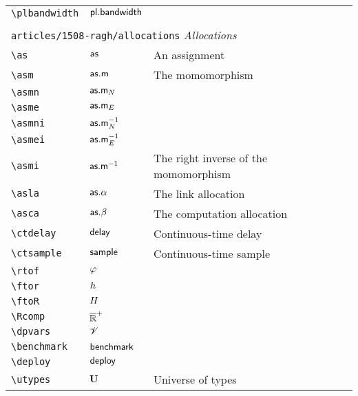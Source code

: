 \begin{longtable}{lll}
 {\color[rgb]{0.5,0.5,0.5}\texttt{\textbackslash plbandwidth}} & $\mathsf{pl.bandwidth}$ & \\ 
  &  & \\ 
 \multicolumn{3}{l}{{\color[rgb]{0.5,0.5,0.5}\texttt{articles/1508-ragh/allocations}} \emph{Allocations}}\\ 
 \hline
{\color[rgb]{0.5,0.5,0.5}\texttt{\textbackslash as}} & $\mathsf{as}$ &  An assignment\\ 
 {\color[rgb]{0.5,0.5,0.5}\texttt{\textbackslash asm}} & $\mathsf{as.m}$ &  The momomorphism \\ 
 {\color[rgb]{0.5,0.5,0.5}\texttt{\textbackslash asmn}} & $\mathsf{as.m}_N$ & \\ 
 {\color[rgb]{0.5,0.5,0.5}\texttt{\textbackslash asme}} & $\mathsf{as.m}_E$ & \\ 
 {\color[rgb]{0.5,0.5,0.5}\texttt{\textbackslash asmni}} & $\mathsf{as.m}^{-1}_N$ & \\ 
 {\color[rgb]{0.5,0.5,0.5}\texttt{\textbackslash asmei}} & $\mathsf{as.m}^{-1}_E$ & \\ 
 {\color[rgb]{0.5,0.5,0.5}\texttt{\textbackslash asmi}} & $\mathsf{as.{m}^{-1}}$ &  The right inverse of the momomorphism \\ 
 {\color[rgb]{0.5,0.5,0.5}\texttt{\textbackslash asla}} & $\mathsf{as.\alpha}$ &  The link allocation\\ 
 {\color[rgb]{0.5,0.5,0.5}\texttt{\textbackslash asca}} & $\mathsf{as.\beta}$ &  The computation allocation\\ 
 {\color[rgb]{0.5,0.5,0.5}\texttt{\textbackslash ctdelay}} & $\mathsf{delay}$ &  Continuous-time delay\\ 
 {\color[rgb]{0.5,0.5,0.5}\texttt{\textbackslash ctsample}} & $\mathsf{sample}$ &  Continuous-time sample\\ 
 {\color[rgb]{0.5,0.5,0.5}\texttt{\textbackslash rtof}} & ${\varphi}$ & \\ 
 {\color[rgb]{0.5,0.5,0.5}\texttt{\textbackslash ftor}} & ${h}$ & \\ 
 {\color[rgb]{0.5,0.5,0.5}\texttt{\textbackslash ftoR}} & ${H}$ & \\ 
 {\color[rgb]{0.5,0.5,0.5}\texttt{\textbackslash Rcomp}} & $\overline{\mathbb{R}}^+$ & \\ 
 {\color[rgb]{0.5,0.5,0.5}\texttt{\textbackslash dpvars}} & $\mathscr{V}$ & \\ 
 {\color[rgb]{0.5,0.5,0.5}\texttt{\textbackslash benchmark}} & $\mathsf{benchmark}$ & \\ 
 {\color[rgb]{0.5,0.5,0.5}\texttt{\textbackslash deploy}} & $\mathsf{deploy}$ & \\ 
 {\color[rgb]{0.5,0.5,0.5}\texttt{\textbackslash utypes}} & $\mathbf{U}$ &  Universe of types\\ 

\end{longtable}
